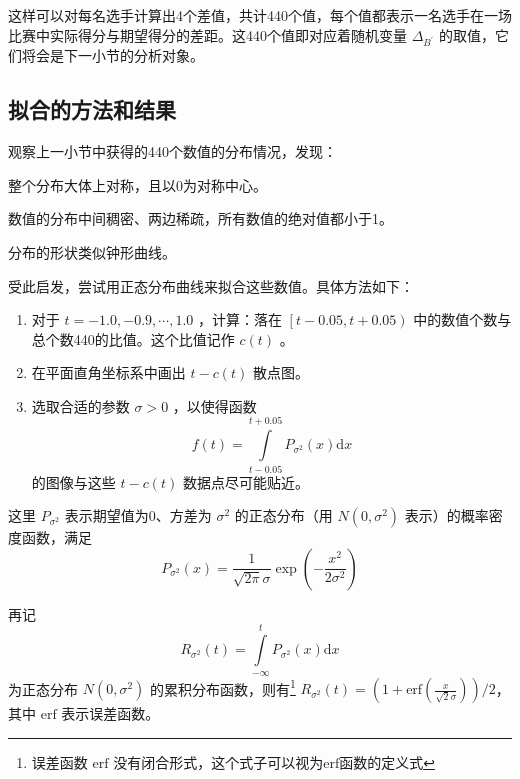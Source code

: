         \vspace{1.5ex}

        这样可以对每名选手计算出4个差值，共计440个值，每个值都表示一名选手在一场比赛中实际得分与期望得分的差距。这440个值即对应着随机变量 $\Delta_{B^{\prime}}$ 的取值，它们将会是下一小节的分析对象。

    \subsection{拟合的方法和结果}

        观察上一小节中获得的440个数值的分布情况，发现：
        \begin{asparaitem}
            \item 整个分布大体上对称，且以$0$为对称中心。
            \item 数值的分布中间稠密、两边稀疏，所有数值的绝对值都小于1。
            \item 分布的形状类似钟形曲线。
        \end{asparaitem}
        
        \vspace{1.5ex}

        受此启发，尝试用正态分布曲线来拟合这些数值。具体方法如下：
        \begin{enumerate}[leftmargin=6em]
            \item [\textbf{步骤 1.}] 对于 $t=-1.0,-0.9,\cdots,1.0$ ，计算：落在 $\left[t-0.05,t+0.05\right)$ 中的数值个数与总个数440的比值。这个比值记作 $c(t)$ 。
            \item [\textbf{步骤 2.}] 在平面直角坐标系中画出 $t-c(t)$ 散点图。
            \item [\textbf{步骤 3.}] 选取合适的参数 $\sigma>0$ ，以使得函数 $$ f(t)=\displaystyle\int\limits_{t-0.05}^{t+0.05} P_{\sigma^2}(x)\mathrm{d} x$$ 的图像与这些 $t-c(t)$ 数据点尽可能贴近。
        \end{enumerate}

        这里 $P_{\sigma^2}$ 表示期望值为0、方差为 $\sigma^2$ 的正态分布（用 $N(0,\sigma^2)$ 表示）的概率密度函数，满足 $$P_{\sigma^2}(x)=\frac{1}{\sqrt{2\pi}\sigma}\exp{\left(-\frac{x^2}{2\sigma^2}\right)}$$

        再记 $$R_{\sigma^2}(t)=\int\limits_{-\infty}^t P_{\sigma^2}(x)\mathrm{d}x$$ 为正态分布 $N(0,\sigma^2)$ 的累积分布函数，则有\footnote{误差函数 $\mathrm{erf}$ 没有闭合形式，这个式子可以视为$\mathrm{erf}$函数的定义式} $R_{\sigma^2}(t)=\left(1+\mathrm{erf}\left(\frac x{\sqrt{2}\sigma}\right)\right)/2$\nobreak，其中 $\mathrm{erf}$ 表示误差函数。

